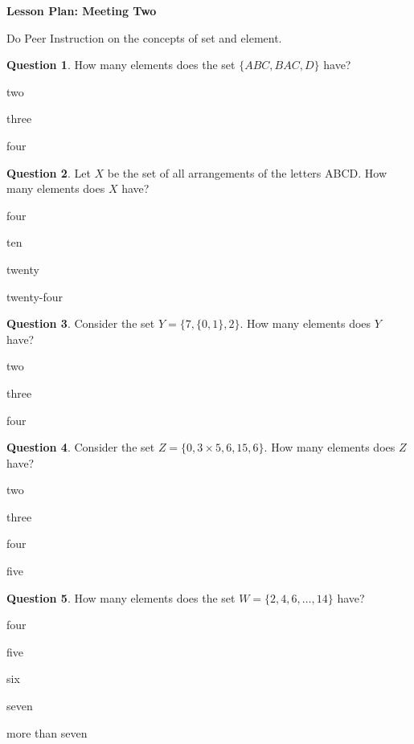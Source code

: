 \documentclass[12pt]{amsart}
\theoremstyle{definition}
\newtheorem{question}{Question}
\begin{document}
\begin{center}
\textbf{\Huge
Lesson Plan: Meeting Two
}
\end{center}
\vspace{.5in}

Do Peer Instruction on the concepts of set and element.

\begin{question}
How many elements does the set $\{ ABC, BAC, D \}$ have?
\begin{compactitem}
\item two
\item three
\item four
\end{compactitem}
\end{question}

\begin{question}
Let $X$ be the set of all arrangements of the letters ABCD.
How many elements does $X$ have?
\begin{compactitem}
\item four
\item ten
\item twenty
\item twenty-four
\end{compactitem}
\end{question}

\begin{question}
Consider the set $Y = \{ 7, \{0, 1\}, 2\}$.
How many elements does $Y$ have?
\begin{compactitem}
\item two
\item three
\item four
\end{compactitem}
\end{question}

\begin{question}
Consider the set $Z = \{ 0, 3\times 5, 6, 15, 6\}$.
How many elements does $Z$ have?
\begin{compactitem}
\item two
\item three
\item four
\item five
\end{compactitem}
\end{question}

\begin{question}
How many elements does the set $W = \{ 2, 4, 6, \ldots, 14 \}$ have?
\begin{compactitem}
\item four
\item five
\item six
\item seven
\item more than seven
\end{compactitem}
\end{question}
\end{document}
